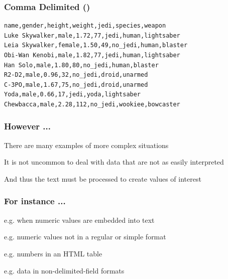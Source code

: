 \documentclass[12pt]{beamer}\usepackage[]{graphicx}\usepackage[]{color}
\begin{document}

\begin{frame}[fragile]
\frametitle{Comma Delimited ()}

{\small
\begin{verbatim}
name,gender,height,weight,jedi,species,weapon
Luke Skywalker,male,1.72,77,jedi,human,lightsaber
Leia Skywalker,female,1.50,49,no_jedi,human,blaster
Obi-Wan Kenobi,male,1.82,77,jedi,human,lightsaber
Han Solo,male,1.80,80,no_jedi,human,blaster
R2-D2,male,0.96,32,no_jedi,droid,unarmed
C-3PO,male,1.67,75,no_jedi,droid,unarmed
Yoda,male,0.66,17,jedi,yoda,lightsaber
Chewbacca,male,2.28,112,no_jedi,wookiee,bowcaster
\end{verbatim}
}

\end{frame}


\begin{frame}
\frametitle{However ...}

\bbi
  \item There are many examples of more complex situations
  \item It is not uncommon to deal with data that are not as easily interpreted
  \item And thus the text must be processed to create values of interest
\ei

\end{frame}


\begin{frame}
\frametitle{For instance ...}

\bi
  \item e.g. when numeric values are embedded into text
  \item e.g. numeric values not in a regular or simple format
  \item e.g. numbers in an HTML table
  \item e.g. data in non-delimited-field formats 
\ei

\end{frame}


\begin{frame}
\begin{center}
\Huge{}
\end{center}
\end{frame}
\end{document}
